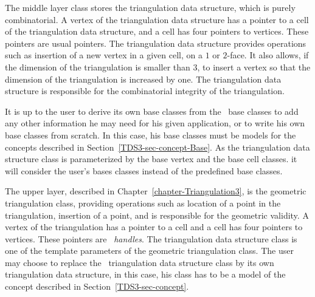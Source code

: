 The middle layer class stores the triangulation data structure, which
is purely combinatorial. A vertex of the triangulation data structure
has a pointer to a cell of the triangulation data structure, and a
cell has four pointers to vertices. These pointers are usual
 pointers. The triangulation data structure provides
operations such as insertion of a new vertex in a given cell, on a
$1$ or $2$-face. It also allows, if the dimension of the triangulation
is smaller than $3$, to insert a vertex so that the dimension of the
triangulation is increased by one. The triangulation data
structure is responsible for the combinatorial integrity of the
triangulation. 

It is up to the user to derive its own base classes from the \cgal\
base classes to add any other information he may need for his given
application, or to write his own base classes from scratch. In this
case, his base classes must be models for the concepts described in
Section~\ref{TDS3-sec-concept-Base}. As the triangulation data
structure class is parameterized by the base vertex and the base cell
classes. it will consider the user's bases classes instead of the
predefined base classes.

The upper layer, described in Chapter~\ref{chapter-Triangulation3}, is
the geometric triangulation class, providing operations such as
location of a point in the triangulation, insertion of a point, and is
responsible for the geometric validity. A vertex of the triangulation
has a pointer to a cell and a cell has four pointers to
vertices. These pointers are \cgal\ \emph{handles}. The triangulation
data structure class is one of the template parameters of the
geometric triangulation class. The user may choose to replace the
\cgal\ triangulation data structure class by its own triangulation
data structure, in this case, his class has to be a model of the
concept described in Section~\ref{TDS3-sec-concept}.

